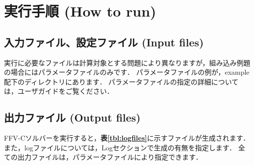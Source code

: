 \documentclass[a4paper,10pt,oneside,fleqn]{jsarticle}
\newcounter{program}
\newenvironment{program}%
{\vspace{0.5\baselineskip}\VerbatimEnvironment%
\begin{breakbox}\setlength{\baselineskip}{.25\normalbaselineskip}\begin{Verbatim}}%
{\end{Verbatim}\end{breakbox}\vspace{0.8\baselineskip}}
\begin{document}
\begin{enumerate}
\begin{enumerate}
\end{enumerate}
\end{enumerate}  



\section{実行手順 (How to run)}

%
\subsection{入力ファイル、設定ファイル (Input files)}

実行に必要なファイルは計算対象とする問題により異なりますが，組み込み例題の場合にはパラメータファイルのみです．
パラメータファイルの例が，example配下のディレクトリにあります．
パラメータファイルの指定の詳細については，ユーザガイドをご覧ください．
   
   
%
\subsection{出力ファイル (Output files)}

FFV-Cソルバーを実行すると，\textbf{表\ref{tbl:logfiles}}に示すファイルが生成されます．
また，logファイルについては，Logセクションで生成の有無を指定します．
全ての出力ファイルは，パラメータファイルにより指定できます．
\end{document}
